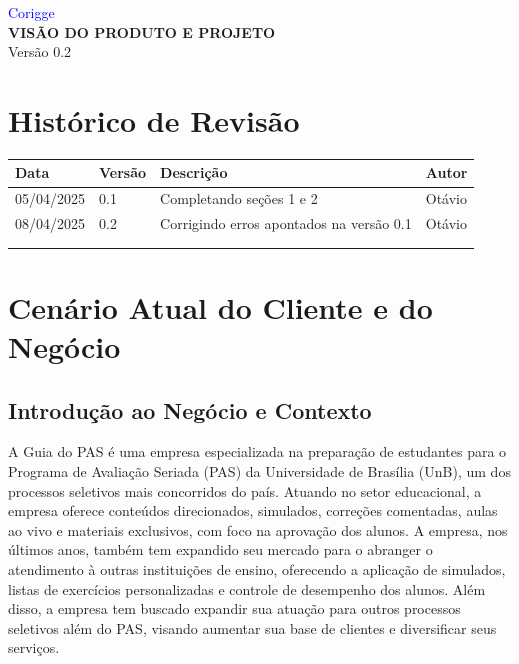 \documentclass[12pt]{article}
\begin{document}
\begin{flushleft}
    {\fontsize{30}{22}\selectfont \textcolor{blue}{Corigge}}\\[2cm]
    {\fontsize{22}{22}\selectfont \textbf{VISÃO DO PRODUTO E PROJETO}}\\[2cm]
    {\fontsize{16}{22}\selectfont Versão 0.2}\\[2cm]
\end{flushleft}

\vfill
\section*{Histórico de Revisão}
\begin{longtable}{|l|l|p{8cm}|l|}
\hline
\textbf{Data} & \textbf{Versão} & \textbf{Descrição} & \textbf{Autor} \\
\hline
05/04/2025& 0.1 & Completando seções 1 e 2  & Otávio\\
\hline
08/04/2025& 0.2 & Corrigindo erros apontados na versão 0.1 & Otávio\\
\hline
& & & \\
\hline
& & & \\
\hline
\end{longtable}

\thispagestyle{empty}
\newpage
\newpage


\section{Cenário Atual do Cliente e do Negócio}

\subsection{Introdução ao Negócio e Contexto}
A Guia do PAS é uma empresa especializada na preparação de estudantes para o Programa de Avaliação Seriada (PAS) da Universidade de Brasília (UnB), um dos processos seletivos mais concorridos do país. Atuando no setor educacional, a empresa oferece conteúdos direcionados, simulados, correções comentadas, aulas ao vivo e materiais exclusivos, com foco na aprovação dos alunos. A empresa, nos últimos anos, também tem expandido seu mercado para o abranger o atendimento à outras instituições de ensino, oferecendo a aplicação de simulados, listas de exercícios personalizadas e controle de desempenho dos alunos. Além disso, a empresa tem buscado expandir sua atuação para outros processos seletivos além do PAS, visando aumentar sua base de clientes e diversificar seus serviços.
\end{document}
